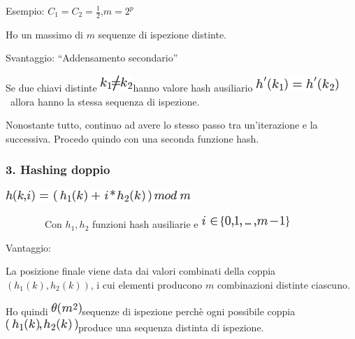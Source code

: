 \documentclass{article}
\begin{document}
{{}

{Esempio}{: $C_1=C_2=\frac{1}{2}$,$m=2^p$}

{}

{Ho un massimo di  $m$ sequenze di ispezione distinte.}

{}

{Svantaggio}{: ``Addensamento secondario''}

{Se due chiavi distinte }\includegraphics{images/image293.png}{hanno valore hash ausiliario }\includegraphics{images/image294.png}{~allora hanno la stessa sequenza di ispezione.}

{}

{Nonostante tutto, continuo ad avere lo stesso passo tra un'iterazione e la successiva. Procedo quindo con una seconda funzione hash.}

\hypertarget{h.8kg9yyirra9i}{\subsubsection{\texorpdfstring{{3.
}{Hashing doppio}}{3. Hashing doppio}}\label{h.8kg9yyirra9i}}

\includegraphics{images/image295.png}

{~~~~~~~~Con $h_1,h_2$ funzioni hash ausiliarie e }\includegraphics{images/image288.png}

{}

{Vantaggio}{:}

{La posizione finale viene data dai valori combinati della coppia $(h_1(k),h_2(k))$, i cui elementi producono $m$ combinazioni distinte ciascuno.}

{Ho quindi }\includegraphics{images/image298.png}{sequenze di ispezione perchè ogni possibile coppia
}\includegraphics{images/image297.png}{produce una sequenza distinta di ispezione.}

}
\end{document}
